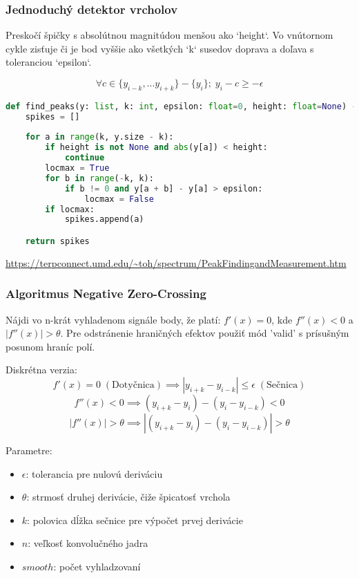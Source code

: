 \cite{spectrometry-peak-detection}
\cite{survey-peaks-valleys}
\cite{peek-mountaineer-method}
\cite{ecg-r-peak-detection}
\cite{ampd-algorithm}

\subsubsection{Jednoduchý detektor vrcholov}
Preskočí špičky s absolútnou magnitúdou menšou ako `height`. Vo vnútornom cykle zisťuje či je bod vyššie ako všetkých `k` susedov doprava a doľava s toleranciou `epsilon`.

\begin{equation}
\forall c \in \{y_{i-k}, ... y_{i+k}\} - \{y_i\}; \; y_i - c \geq -\epsilon
\end{equation}

\begin{lstlisting}[language=Python]
def find_peaks(y: list, k: int, epsilon: float=0, height: float=None) -> list:
    spikes = []
    
    for a in range(k, y.size - k): 
        if height is not None and abs(y[a]) < height:
            continue
        locmax = True
        for b in range(-k, k):
            if b != 0 and y[a + b] - y[a] > epsilon:
                locmax = False
        if locmax:
            spikes.append(a)

    return spikes
\end{lstlisting}
\url{https://terpconnect.umd.edu/~toh/spectrum/PeakFindingandMeasurement.htm}

\subsubsection{Algoritmus Negative Zero-Crossing}
Nájdi vo n-krát vyhladenom signále body, že platí: $f'(x) = 0$, kde $f''(x) < 0$ a $|f''(x)| > \theta$. Pre odstránenie hraničných efektov použiť mód 'valid' s prísušným posunom hraníc polí.

Diskrétna verzia:
$$f'(x) = 0 \; \mathrm{(Dotyčnica)} \implies |y_{i+k} - y_{i-k}| \leq \epsilon \;\mathrm{(Sečnica)}$$
$$f''(x) < 0 \implies (y_{i+k} - y_i) - (y_i - y_{i-k}) < 0$$
$$|f''(x)| > \theta \implies |(y_{i+k} - y_i) - (y_i - y_{i-k})| > \theta$$

Parametre: 
\begin{itemize}
\item $\epsilon$: tolerancia pre nulovú deriváciu
\item $\theta$: strmosť druhej derivácie, čiže špicatosť vrchola
\item $k$: polovica dĺžka sečnice pre výpočet prvej derivácie
\item $n$: veľkosť konvolučného jadra
\item $smooth$: počet vyhladzovaní
\end{itemize}

